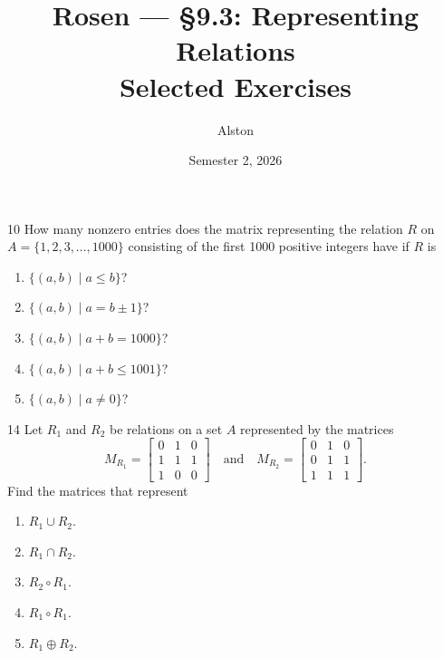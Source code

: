 \documentclass[11pt]{article}
\title{Rosen --- \S 9.3: Representing Relations\\ \large Selected Exercises}
\author{Alston}
\date{Semester 2, 2026}
\begin{document}
\maketitle

\begin{exercise}{10}
    How many nonzero entries does the matrix representing the
    relation $R$ on $A = \{1, 2, 3, \dots, 1000\}$ consisting of the
    first 1000 positive integers have if $R$ is
    \begin{enumerate}[label=(\alph*)]
        \item $\{(a,b) \mid a \leq b\}$?
        \item $\{(a,b) \mid a = b \pm 1\}$?
        \item $\{(a,b) \mid a + b = 1000\}$?
        \item $\{(a,b) \mid a + b \leq 1001\}$?
        \item $\{(a,b) \mid a \neq 0\}$?
    \end{enumerate}
\end{exercise}

\begin{exercise}{14}
    Let $R_1$ and $R_2$ be relations on a set $A$ represented by the
    matrices
    \[
    M_{R_1} = \begin{bmatrix} 0 & 1 & 0 \\ 1 & 1 & 1 \\ 1 & 0 & 0 \end{bmatrix}
    \quad \text{and} \quad
    M_{R_2} = \begin{bmatrix} 0 & 1 & 0 \\ 0 & 1 & 1 \\ 1 & 1 & 1 \end{bmatrix}.
    \]
    Find the matrices that represent
    \begin{enumerate}[label=(\alph*)]
        \item $R_1 \cup R_2$.
        \item $R_1 \cap R_2$.
        \item $R_2 \circ R_1$.
        \item $R_1 \circ R_1$.
        \item $R_1 \oplus R_2$.
    \end{enumerate}
\end{exercise}
\end{document}
